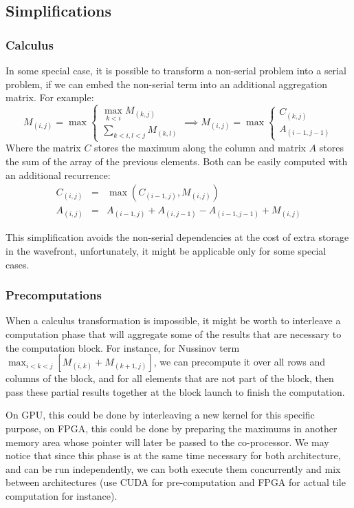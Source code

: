 \documentclass[11pt]{article}
\begin{document}
\subsection{Simplifications}
\subsubsection{Calculus}
In some special case, it is possible to transform a non-serial problem into a serial problem, if we can embed the non-serial term into an additional aggregation matrix. For example:
	\[M_{(i,j)}=\max\left\{\begin{array}{l} \max\limits_{k<i} M_{(k,j)}
	\\ \sum\limits_{k<i, l<j}M_{(k,l)} \end{array}\right.
	\implies M_{(i,j)}=\max\left\{\begin{array}{l} C_{(k,j)} \\ A_{(i-1,j-1)} \end{array}\right.\]
Where the matrix $C$ stores the maximum along the column and matrix $A$ stores the sum of the array of the previous elements. Both can be easily computed with an additional recurrence:
	\[\begin{array}{rcl} C_{(i,j)}&=&\max(C_{(i-1,j)}, M_{(i,j)}) \\
	A_{(i,j)}&=&A_{(i-1,j)}+A_{(i,j-1)}-A_{(i-1,j-1)}+M_{(i,j)}\end{array}\]

This simplification avoids the non-serial dependencies at the cost of extra storage in the wavefront, unfortunately, it might be applicable only for some special cases.

\subsubsection{Precomputations}
When a calculus transformation is impossible, it might be worth to interleave a computation phase that will aggregate some of the results that are necessary to the computation block. For instance, for Nussinov term $\max_{i<k<j} [ M_{(i,k)}+M_{(k+1,j)} ]$, we can precompute it over all rows and columns of the block, and for all elements that are not part of the block, then pass these partial results together at the block launch to finish the computation.

On GPU, this could be done by interleaving a new kernel for this specific purpose, on FPGA, this could be done by preparing the maximums in another memory area whose pointer will later be passed to the co-processor. We may notice that since this phase is at the same time necessary for both architecture, and can be run independently, we can both execute them concurrently and mix between architectures (use CUDA for pre-computation and FPGA for actual tile computation for instance).
\end{document}
